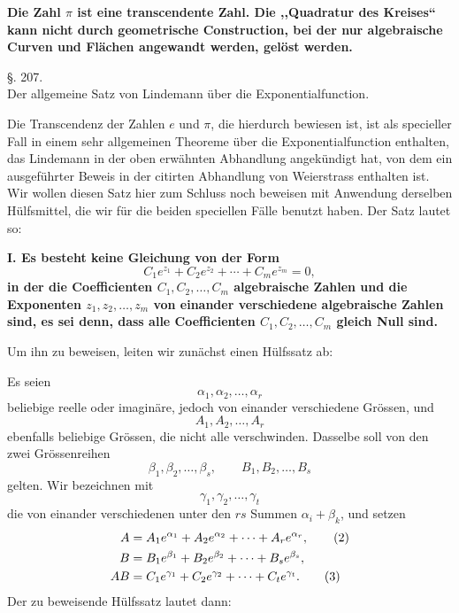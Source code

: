 \documentclass[11pt]{article}
\begin{document}
\begin{center}
\textbf{Die Zahl $\pi$ ist eine transcendente Zahl. Die ,,Quadratur des Kreises`` kann nicht durch geometrische Construction, bei der nur algebraische Curven und Flächen angewandt werden, gelöst werden.}
\end{center}

\begin{center}
{\large §. 207.}\\[0.4em]
{\large Der allgemeine Satz von Lindemann über die Exponentialfunction.}
\end{center}

Die Transcendenz der Zahlen $e$ und $\pi$, die hierdurch bewiesen ist, ist als specieller Fall in einem sehr allgemeinen Theoreme über die Exponentialfunction enthalten, das Lindemann in der oben erwähnten Abhandlung angekündigt hat, von dem ein ausgeführter Beweis in der citirten Abhandlung von Weierstrass enthalten ist. Wir wollen diesen Satz hier zum Schluss noch beweisen mit Anwendung derselben Hülfsmittel, die wir für die beiden speciellen Fälle benutzt haben. Der Satz lautet so:

\textbf{I. Es besteht keine Gleichung von der Form}
\begin{equation}\tag{1}
C_1e^{z_1}+C_2e^{z_2}+\cdots+C_me^{z_m}=0,
\end{equation}
\textbf{in der die Coefficienten $C_1,C_2,\ldots,C_m$ algebraische Zahlen und die Exponenten $z_1,z_2,\ldots,z_m$ von einander verschiedene algebraische Zahlen sind, es sei denn, dass alle Coefficienten $C_1,C_2,\ldots,C_m$ gleich Null sind.}

Um ihn zu beweisen, leiten wir zunächst einen Hülfssatz ab:

Es seien
\[
\alpha_1,\alpha_2,\ldots,\alpha_r
\]
beliebige reelle oder imaginäre, jedoch von einander verschiedene Grössen, und
\[
A_1,A_2,\ldots,A_r
\]
ebenfalls beliebige Grössen, die nicht alle verschwinden. Dasselbe soll von den zwei Grössenreihen
\[
\beta_1,\beta_2,\ldots,\beta_s,\qquad
B_1,B_2,\ldots,B_s
\]
gelten. Wir bezeichnen mit
\[
\gamma_1,\gamma_2,\ldots,\gamma_t
\]
die von einander verschiedenen unter den $rs$ Summen $\alpha_i+\beta_k$, und setzen
\begin{align}
A&=A_1e^{\alpha_1}+A_2e^{\alpha_2}+\cdots+A_re^{\alpha_r},\tag{2}\\
B&=B_1e^{\beta_1}+B_2e^{\beta_2}+\cdots+B_se^{\beta_s},\notag\\
AB&=C_1e^{\gamma_1}+C_2e^{\gamma_2}+\cdots+C_te^{\gamma_t}.\tag{3}
\end{align}
Der zu beweisende Hülfssatz lautet dann:
\end{document}
